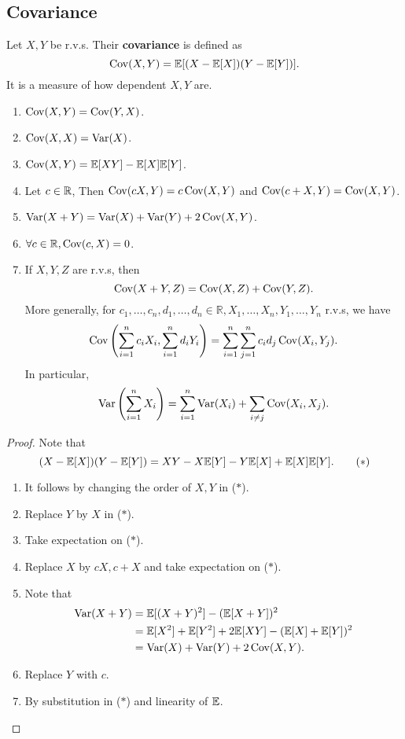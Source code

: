\subsection{Covariance}
\begin{definition}
    Let $X,Y$ be r.v.s. Their \textbf{covariance} is defined as 
    \[
        \operatorname{Cov} (X,Y) = {\mathbb{E}}[(X-{\mathbb{E}}[X])(Y-{\mathbb{E}}[Y])].
    \]
    It is a measure of how dependent $X,Y$ are.
\end{definition}
\begin{proposition}
    \begin{enumerate}
        \item $ \operatorname{Cov}(X,Y)=\operatorname{Cov}(Y,X) $.
        \item $ \operatorname{Cov}(X,X)=\operatorname{Var}(X) $.
        \item $ \operatorname{Cov}(X,Y) = {\mathbb{E}}[XY]-{\mathbb{E}}[X]{\mathbb{E}}[Y] $.
        \item Let $c\in {\mathbb{R}}$, Then $ \operatorname{Cov}(cX,Y) = c\operatorname{Cov}(X,Y) $ and $ \operatorname{Cov}(c+X,Y)=\operatorname{Cov}(X,Y) $.
        \item $ \operatorname{Var}(X+Y) = \operatorname{Var}(X)+\operatorname{Var}(Y)+2\operatorname{Cov}(X,Y) $.
        \item $ \forall c\in \mathbb{R}, \operatorname{Cov}(c,X)=0 $.
        \item If $ X,Y,Z $ are r.v.s, then 
        \[
            \operatorname{Cov}(X+Y,Z) = \operatorname{Cov}(X,Z)+\operatorname{Cov}(Y,Z).
        \]
        More generally, for $ c_1,\dots,c_n,d_1,\dots,d_n\in \mathbb{R}, X_1,\dots,X_n,Y_1,\dots,Y_n $ r.v.s, we have 
        \[
            \operatorname{Cov} \left( \sum_{i=1}^{n}c_i X_i,\sum_{i=1}^{n}d_i Y_i \right) = \sum_{i=1}^{n}\sum_{j=1}^{n}c_i d_j\operatorname{Cov}(X_i,Y_j).
        \]
        In particular, 
        \[
            \operatorname{Var}\left( \sum_{i=1}^{n}X_i \right) = \sum_{i=1}^{n}\operatorname{Var}(X_i)+\sum_{i\neq j} \operatorname{Cov}(X_i,X_j).
        \]
    \end{enumerate}
\end{proposition}
\begin{proof}
    Note that 
    \[
        (X-{\mathbb{E}}[X])(Y-{\mathbb{E}}[Y]) = XY-X{\mathbb{E}}[Y]-Y{\mathbb{E}}[X]+{\mathbb{E}}[X]{\mathbb{E}}[Y].\tag{$*$}
    \]
    \begin{enumerate}
        \item It follows by changing the order of $X,Y$ in ($*$).
        \item Replace $Y$ by $X$ in ($*$).
        \item Take expectation on ($*$).
        \item Replace $X$ by $cX,c+X$ and take expectation on ($*$).
        \item Note that 
        \begin{align*}
            \operatorname{Var}(X+Y)&= {\mathbb{E}}[(X+Y)^2]-({\mathbb{E}}[X+Y])^2\\ 
            &= {\mathbb{E}}[X^2]+{\mathbb{E}}[Y^2]+2{\mathbb{E}}[XY]-({\mathbb{E}}[X]+{\mathbb{E}}[Y])^2\\ 
            &= \operatorname{Var}(X)+\operatorname{Var}(Y)+2\operatorname{Cov}(X,Y).
        \end{align*}
        \item Replace $Y$ with $c$.
        \item By substitution in ($*$) and linearity of $ {\mathbb{E}} $.
    \end{enumerate}
\end{proof}

